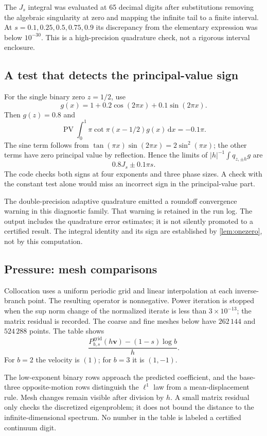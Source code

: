 \documentclass[11pt,a4paper]{article}
\numberwithin{equation}{section}
\theoremstyle{definition}
\theoremstyle{remark}
\newcommand{\dd}{\,\mathrm d}
\newcommand{\PV}{\operatorname{PV}}
\newcommand{\vel}{\boldsymbol v}
\begin{document}
The $J_s$ integral was evaluated at 65 decimal digits after substitutions
removing the algebraic singularity at zero and mapping the infinite
tail to a finite interval. At $s=0.1,0.25,0.5,0.75,0.9$ its discrepancy
from the elementary expression was below $10^{-30}$. This is a
high-precision quadrature check, not a rigorous interval enclosure.

\subsection{A test that detects the principal-value sign}
For the single binary zero $z=1/2$, use
\[
 g(x)=1+0.2\cos(2\pi x)+0.1\sin(2\pi x).
\]
Then $g(z)=0.8$ and
\[
 \PV\int_0^1\pi\cot\pi(x-1/2)g(x)\dd x=-0.1\pi.
\]
The sine term follows from
$\tan(\pi x)\sin(2\pi x)=2\sin^2(\pi x)$; the other terms have
zero principal value by reflection. Hence the limits of
$|h|^{-1}\int q_{z,\pm h}g$ are
\[
 0.8J_s\pm0.1\pi s.
\]
The code checks both signs at four exponents and three phase sizes.
A check with the constant test alone would miss an incorrect sign in
the principal-value part.

The double-precision adaptive quadrature emitted a roundoff convergence
warning in this diagnostic family. That warning is retained in the run
log. The output includes the quadrature error estimates; it is not
silently promoted to a certified result. The integral identity and its
sign are established by \cref{lem:onezero}, not by this computation.

\subsection{Pressure: mesh comparisons}
Collocation uses a uniform periodic grid and linear interpolation at
each inverse-branch point. The resulting operator is nonnegative.
Power iteration is stopped when the sup norm change of the normalized
iterate is less than $3\times10^{-13}$; the matrix residual is recorded.
The coarse and fine meshes below have $262\,144$ and $524\,288$ points.
The table shows
\[
 \frac{P^{\mathrm{grid}}_{b,s}(h\vel)-(1-s)\log b}{h}.
\]
For $b=2$ the velocity is $(1)$; for $b=3$ it is $(1,-1)$.
\begin{center}\small

\end{center}
The low-exponent binary rows approach the predicted coefficient, and
the base-three opposite-motion rows distinguish the $\ell^1$ law from
a mean-displacement rule. Mesh changes remain visible after division
by $h$. A small matrix residual only checks the discretized eigenproblem;
it does not bound the distance to the infinite-dimensional spectrum.
No number in the table is labeled a certified continuum digit.
\end{document}
